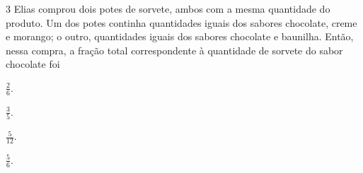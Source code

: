 




\num{3}  Elias comprou dois potes de sorvete, ambos com a mesma quantidade do
produto. Um dos potes continha quantidades iguais dos sabores chocolate,
creme e morango; o outro, quantidades iguais dos sabores chocolate e
baunilha. Então, nessa compra, a fração total
correspondente à quantidade de sorvete do sabor chocolate foi

\begin{multicols}{4}
\begin{escolha}
\item $\frac{2}{6}$. 
\item $\frac{3}{5}$. 
\item $\frac{5}{12}$. 
\item $\frac{5}{6}$.
\end{escolha}
\end{multicols}

